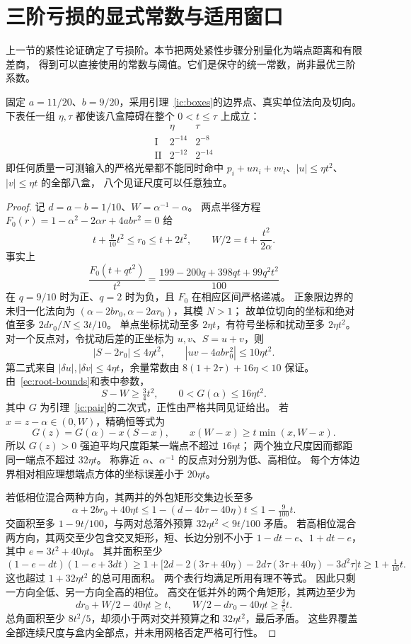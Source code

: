 \section{三阶亏损的显式常数与适用窗口}\label{ec:section}
上一节的紧性论证确定了亏损阶。本节把两处紧性步骤分别量化为端点距离和有限差商，
得到可以直接使用的常数与阈值。它们是保守的统一常数，尚非最优三阶系数。

\begin{lemma}[显式的独立八盒证书]\label{ec:boxes}
固定 $a=11/20$、$b=9/20$，采用引理~\ref{ic:boxes}的边界点、真实单位法向及切向。
下表任一组 $\eta,\tau$ 都使该八盒障碍在整个 $0<t\le\tau$ 上成立：
\[
 \begin{array}{c|cc}
 &\eta&\tau\\\hline
 \mathrm I&2^{-14}&2^{-8}\\
 \mathrm {II}&2^{-12}&2^{-14}
 \end{array}
\]
即任何质量一可测输入的严格光晕都不能同时命中
$p_i+u n_i+v v_i$、$|u|\le\eta t^2$、$|v|\le\eta t$ 的全部八盒，
八个见证尺度可以任意独立。
\end{lemma}
\begin{proof}
记 $d=a-b=1/10$、$W=\alpha^{-1}-\alpha$。
两点半径方程 $F_0(r)=1-\alpha^2-2\alpha r+4abr^2=0$ 给
\begin{equation}\label{ec:root-bounds}
 t+\tfrac9{10}t^2\le r_0\le t+2t^2,\qquad
 W/2=t+\frac{t^2}{2\alpha}.
\end{equation}
事实上
\[
 \frac{F_0(t+qt^2)}{t^2}
 =\frac{199-200q+398qt+99q^2t^2}{100}
\]
在 $q=9/10$ 时为正、$q=2$ 时为负，且 $F_0$ 在相应区间严格递减。
正象限边界的未归一化法向为
$(\alpha-2br_0,\alpha-2ar_0)$，其模 $N>1$；
故单位切向的坐标和绝对值至多 $2dr_0/N\le3t/10$。
单点坐标扰动至多 $2\eta t$，有符号坐标和扰动至多 $2\eta t^2$。
对一个反点对，令扰动后差的正坐标为 $u,v$、$S=u+v$，则
\[
 |S-2r_0|\le4\eta t^2,\qquad |uv-4abr_0^2|\le10\eta t^2.
\]
第二式来自 $|\delta u|,|\delta v|\le4\eta t$，余量常数由
$8(1+2\tau)+16\eta<10$ 保证。
由~\eqref{ec:root-bounds}和表中参数，
\[
 S-W\ge\tfrac34t^2,\qquad 0<G(\alpha)\le16\eta t^2.
\]
其中 $G$ 为引理~\ref{ic:pair}的二次式，正性由严格共同见证给出。
若 $x=z-\alpha\in(0,W)$，精确恒等式为
\[
 G(z)=G(\alpha)-x(S-x),\qquad
 x(W-x)\ge t\min(x,W-x).
\]
所以 $G(z)>0$ 强迫平均尺度距某一端点不超过 $16\eta t$；
两个独立尺度因而都距同一端点不超过 $32\eta t$。
称靠近 $\alpha$、$\alpha^{-1}$ 的反点对分别为低、高相位。
每个方体边界相对相应理想端点方体的坐标误差小于 $20\eta t$。

若低相位混合两种方向，其两并的外包矩形交集边长至多
\[
 \alpha+2br_0+40\eta t
 \le1-(d-4b\tau-40\eta)t\le1-\tfrac9{100}t.
\]
交面积至多 $1-9t/100$，与两对总落外预算 $32\eta t^2<9t/100$ 矛盾。
若高相位混合两方向，其两交至少包含交叉矩形，短、长边分别不小于
$1-dt-e$、$1+dt-e$，其中 $e=3t^2+40\eta t$。
其并面积至少
\[
 (1-e-dt)(1-e+3dt)
 \ge1+\bigl[2d-2(3\tau+40\eta)-2d\tau(3\tau+40\eta)-3d^2\tau\bigr]t
 \ge1+\tfrac1{10}t.
\]
这也超过 $1+32\eta t^2$ 的总可用面积。
两个表行均满足所用有理不等式。
因此只剩一方向全低、另一方向全高的相位。
高交在低并外的两个角矩形，其两边至少为
\[
 dr_0+W/2-40\eta t\ge t,\qquad
 W/2-dr_0-40\eta t\ge\tfrac45t.
\]
总角面积至少 $8t^2/5$，却须小于两对交并预算之和 $32\eta t^2$，最后矛盾。
这些界覆盖全部连续尺度与盒内全部点，并未用网格否定严格可行性。
\end{proof}

